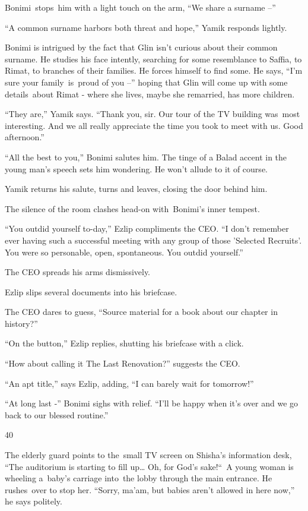 \documentclass[twoside,11pt]{book}
\begin{document}
Bonimi{\ }stops{\ }him with a light touch on the arm, ``We share a surname
--'' 

``A common surname harbors both threat and hope,'' Yamik responds lightly.

Bonimi is intrigued by the fact that Glin isn't curious about their common surname. He studies his face intently,
searching for some resemblance to Saffia, to Rimat, to branches of their families. He forces himself to find some. He
says, ``I'm sure your family{\ }is\ proud of you --'' hoping that Glin will
come up with some details~about Rimat - where she lives, maybe she remarried, has more children. 

``They are,'' Yamik says. ``Thank you, sir. Our tour of the TV building was\ most
interesting. And we all really appreciate the time you took to meet with us. Good afternoon.'' 

``All the best to you,'' Bonimi salutes him. The tinge of a Balad accent in the young man's
speech sets him wondering. He won't allude to it of course. 

Yamik returns his salute, turns and leaves, closing the door behind him.

The silence of the room clashes head-on with~Bonimi's inner tempest.

``You outdid yourself to-day,'' Ezlip compliments the CEO. ``I don't remember
ever having such a successful meeting with any group of those {}'Selected Recruits{}'. You were so personable, open,
spontaneous. You outdid yourself.''

The CEO spreads his arms dismissively. 

Ezlip slips several documents into his briefcase.\textbf{\ }

The CEO dares to guess, ``Source material for a book about our chapter in history?'' 

``On the button,'' Ezlip replies, shutting his briefcase with a click. 

``How about calling it The Last Renovation?'' suggests the CEO. 

``An apt title,'' says Ezlip, adding, ``I can barely wait for
tomorrow!''

``At long last -'' Bonimi sighs with relief. ``I'll be happy when it's over and
we go back to our blessed routine.''


\bigskip

40\ \ 

The elderly guard points to the~small TV screen on Shisha's information desk, ``The auditorium is starting
to fill up{\dots} Oh, for God's sake!``\ A young woman is wheeling a~baby's carriage into~the lobby
through the main entrance. He rushes{\ }over to stop her. ``Sorry,
ma'am, but babies aren't allowed in here now,'' he says politely.
\end{document}
